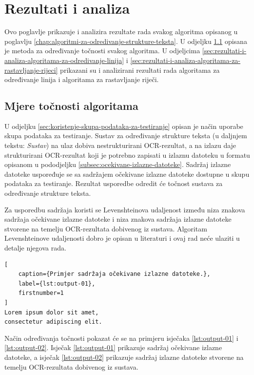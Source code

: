 \documentclass[times, utf8, zavrsni]{fer}
\begin{document}
\chapter{Rezultati i analiza}
Ovo poglavlje prikazuje i analizira rezultate rada svakog algoritma
opisanog u poglavlju \ref{chap:algoritmi-za-odredivanje-strukture-teksta}.
U odjeljku \ref{sec:mjera-tocnosti-algoritama} opisana je metoda
za određivanje točnosti svakog algoritma. U odjeljcima
\ref{sec:rezultati-i-analiza-algoritama-za-odredivanje-linija} i
\ref{sec:rezultati-i-analiza-algoritama-za-rastavljanje-rijeci}
prikazani su i analizirani rezultati rada algoritama za određivanje linija i
algoritama za rastavljanje riječi.








\section{Mjere točnosti algoritama}
\label{sec:mjera-tocnosti-algoritama}
U odjeljku \ref{sec:koristenje-skupa-podataka-za-testiranje} opisan je način
uporabe skupa podataka za testiranje. Sustav za određivanje strukture teksta
(u daljnjem tekstu: \emph{Sustav}) na ulaz dobiva nestrukturirani OCR-rezultat,
a na izlazu daje strukturirani OCR-rezultat koji je potrebno zapisati u izlaznu
datoteku u formatu opisanom u pododjeljku
\ref{subsec:ocekivane-izlazne-datoteke}. Sadržaj izlazne datoteke uspoređuje se
sa sadržajem očekivane izlazne datoteke dostupne u skupu podataka za
testiranje. Rezultat usporedbe odredit će točnost sustava za određivanje
strukture teksta.

Za usporedbu sadržaja koristi se Levenshteinova udaljenost između niza znakova
sadržaja očekivane izlazne datoteke i niza znakova sadržaja izlazne datoteke
stvorene na temelju OCR-rezultata dobivenog iz sustava.
Algoritam Levenshteinove udaljenosti dobro je opisan u literaturi i ovaj rad
neće ulaziti u detalje njegova rada.

\begin{lstlisting}[
    caption={Primjer sadržaja očekivane izlazne datoteke.},
    label={lst:output-01},
    firstnumber=1
]
Lorem ipsum dolor sit amet,
consectetur adipiscing elit.
\end{lstlisting}

Način određivanja točnosti pokazat će se na primjeru isječaka
\ref{lst:output-01} i \ref{lst:output-02}. Isječak \ref{lst:output-01}
prikazuje sadržaj očekivane izlazne datoteke, a isječak \ref{lst:output-02}
prikazuje sadržaj izlazne datoteke stvorene na temelju OCR-rezultata dobivenog
iz sustava.
\end{document}
